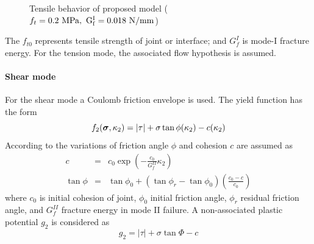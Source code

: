 \documentclass[a4paper]{article}
\newcommand{\mbf}[1]{\mbox{\boldmath$#1$}}
\newcommand{\del}[2]{\mbox{$\displaystyle\frac{#1}{#2}$}}
\newcommand{\sig}{\mbf{\sigma}}
\begin{document}
\begin{figure}[!htb]
\fi
  \caption{Tensile behavior of proposed model ($f_t=0.2\ \rm{MPa},\ G_f^I=0.018\ \rm{N/mm}$)}
  \label{tensfig}
\end{figure}
The $f_{t0}$ represents tensile strength of joint or interface; and $G^I_f$ is mode-I fracture energy. For the tension mode, the associated flow hypothesis is assumed.


\paragraph{Shear mode}
For the shear mode a Coulomb friction envelope is used. The yield function has the form
\begin{equation}
  f_2(\sig,\kappa_2) = \vert\tau\vert+\sigma\tan\phi(\kappa_2)-c(\kappa_2)
\end{equation}
According to \cite{Rots} the variations of friction angle $\phi$ and cohesion $c$ are assumed as
\begin{eqnarray}
  \label{c}
  c&=&c_0\exp\left(-\del{c_0}{G^{II}_f}\kappa_2\right)\\
  \tan\phi&=&\tan\phi_0+(\tan\phi_r-\tan\phi_0)\left(\del{c_0-c}{c_0}\right)
\end{eqnarray}
where $c_0$ is initial cohesion of joint, $\phi_0$ initial friction angle, $\phi_r$ residual friction angle, and $G^{II}_f$ fracture energy in mode II failure. A non-associated plastic potential $g_2$ is considered as
\begin{equation}
  g_2=\vert\tau\vert+\sigma\tan\Phi-c
\end{equation}
\end{document}
